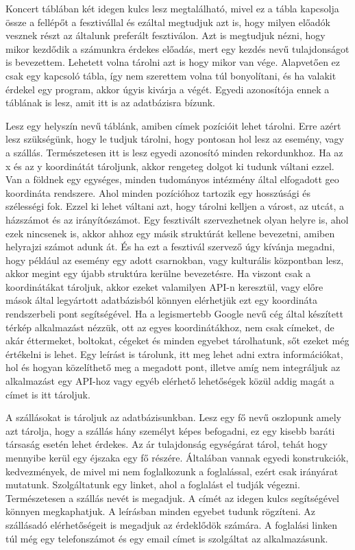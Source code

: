 Koncert táblában két idegen kulcs lesz megtalálható, mivel ez a tábla kapcsolja össze a fellépőt a fesztivállal és ezáltal megtudjuk azt is, hogy milyen előadók vesznek részt az általunk preferált fesztiválon. Azt is megtudjuk nézni, hogy mikor kezdődik a számunkra érdekes előadás, mert egy kezdés nevű tulajdonságot is bevezettem. Lehetett volna tárolni azt is hogy mikor van vége. Alapvetően ez csak egy kapcsoló tábla, így nem szerettem volna túl bonyolítani, és ha valakit érdekel egy program, akkor úgyis kivárja a végét. Egyedi azonosítója ennek a táblának is lesz, amit itt is az adatbázisra bízunk.

Lesz egy helyszín nevű táblánk, amiben címek pozícióit lehet tárolni. Erre azért lesz szükségünk, hogy le tudjuk tárolni, hogy pontosan hol lesz az esemény, vagy a szállás. Természetesen itt is lesz egyedi azonosító minden rekordunkhoz. Ha az x és az y koordinátát tároljunk, akkor rengeteg dolgot ki tudunk váltani ezzel. Van a földnek egy egységes, minden tudományos intézmény által elfogadott geo koordináta rendszere. Ahol minden pozícióhoz tartozik egy hosszúsági és szélességi fok. Ezzel ki lehet váltani azt, hogy tárolni kelljen a várost, az utcát, a házszámot és az irányítószámot. Egy fesztivált szervezhetnek olyan helyre is, ahol ezek nincsenek is, akkor ahhoz egy másik struktúrát kellene bevezetni, amiben helyrajzi számot adunk át. És ha ezt a fesztivál szervező úgy kívánja megadni, hogy például az esemény egy adott csarnokban, vagy kulturális központban lesz, akkor megint egy újabb struktúra kerülne bevezetésre. Ha viszont csak a koordinátákat tároljuk, akkor ezeket valamilyen API-n keresztül, vagy előre mások által legyártott adatbázisból könnyen elérhetjük ezt egy koordináta rendszerbeli pont segítségével. Ha a legismertebb Google nevű cég által készített térkép alkalmazást nézzük, ott az egyes koordinátákhoz, nem csak címeket, de akár éttermeket, boltokat, cégeket és minden egyebet tárolhatunk, sőt ezeket még értékelni is lehet. Egy leírást is tárolunk, itt meg lehet adni extra információkat, hol és hogyan közelíthető meg a megadott pont, illetve amíg nem integráljuk az alkalmazást egy API-hoz vagy egyéb elérhető lehetőségek közül addig magát a címet is itt tároljuk.

A szállásokat is tároljuk az adatbázisunkban. Lesz egy fő nevű oszlopunk amely azt tárolja, hogy a szállás hány személyt képes befogadni, ez egy kisebb baráti társaság esetén lehet érdekes. Az ár tulajdonság egységárat tárol, tehát hogy mennyibe kerül egy éjszaka egy fő részére. Általában vannak egyedi konstrukciók, kedvezmények, de mivel mi nem foglalkozunk a foglalással, ezért csak irányárat mutatunk. Szolgáltatunk egy linket, ahol a foglalást el tudják végezni. Természetesen a szállás nevét is megadjuk. A címét az idegen kulcs segítségével könnyen megkaphatjuk. A leírásban minden egyebet tudunk rögzíteni. Az szállásadó elérhetőségeit is megadjuk az érdeklődök számára. A foglalási linken túl még egy telefonszámot és egy email címet is szolgáltat az alkalmazásunk.

